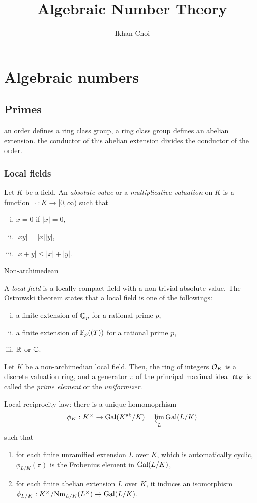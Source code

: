 \documentclass{../../large}
\newcommand{\ab}{\mathrm{ab}}
\newcommand{\Nm}{\mathrm{Nm}}
\begin{document}
\title{Algebraic Number Theory}
\author{Ikhan Choi}
\maketitle
\tableofcontents

\part{Algebraic numbers}
\chapter{Primes}
an order defines a ring class group, a ring class group defines an abelian extension.
the conductor of this abelian extension divides the conductor of the order.

\section{Local fields}
\begin{prb}
Let $K$ be a field.
An \emph{absolute value} or a \emph{multiplicative valuation} on $K$ is a function $|\cdot|:K\to[0,\infty)$ such that
\begin{enumerate}[(i)]
\item $x=0$ if $|x|=0$,
\item $|xy|=|x||y|$,
\item $|x+y|\le|x|+|y|$.
\end{enumerate}
Non-archimedean
\end{prb}

\begin{prb}
A \emph{local field} is a locally compact field with a non-trivial absolute value.
The Ostrowski theorem states that a local field is one of the followings:
\begin{enumerate}[(i)]
\item a finite extension of $\mathbb{Q}_p$ for a rational prime $p$,
\item a finite extension of $\mathbb{F}_p((T))$ for a rational prime $p$,
\item $\mathbb{R}$ or $\mathbb{C}$.
\end{enumerate}
Let $K$ be a non-archimedian local field.
Then, the ring of integers $\mathcal{O}_K$ is a discrete valuation ring, and a generator $\pi$ of the principal maximal ideal $\mathfrak{m}_K$ is called the \emph{prime element} or the \emph{uniformizer}.

Local reciprocity law: there is a unique homomoprhism
\[\phi_K:K^\times\to\Gal(K^\ab/K)=\varprojlim_L\Gal(L/K)\]
such that
\begin{enumerate}
\item for each finite unramified extension $L$ over $K$, which is automatically cyclic, $\phi_{L/K}(\pi)$ is the Frobenius element in $\operatorname{Gal}(L/K)$,
\item for each finite abelian extension $L$ over $K$, it induces an isomorphism $\phi_{L/K}:K^\times/\Nm_{L/K}(L^\times)\to\Gal(L/K)$.
\end{enumerate}
\end{prb}
\end{document}
